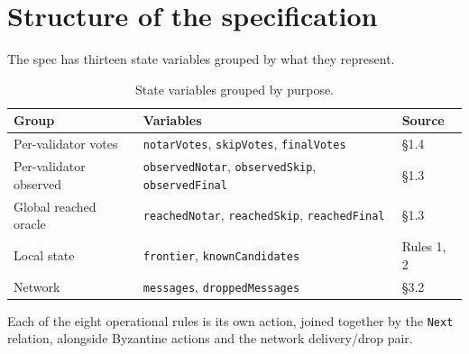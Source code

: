 \documentclass[11pt,a4paper]{article}
\begin{document}
\section{Structure of the specification}\label{sec:spec}

The spec has thirteen state variables grouped by what they represent.

\begin{table}[h]
\centering
\begin{tabular}{lll}
\toprule
Group & Variables & Source \\
\midrule
Per-validator votes      & \texttt{notarVotes}, \texttt{skipVotes}, \texttt{finalVotes}        & §1.4 \\
Per-validator observed   & \texttt{observedNotar}, \texttt{observedSkip}, \texttt{observedFinal} & §1.3 \\
Global reached oracle    & \texttt{reachedNotar}, \texttt{reachedSkip}, \texttt{reachedFinal}  & §1.3 \\
Local state              & \texttt{frontier}, \texttt{knownCandidates}                          & Rules 1, 2 \\
Network                  & \texttt{messages}, \texttt{droppedMessages}                          & §3.2 \\
\bottomrule
\end{tabular}
\caption{State variables grouped by purpose.}
\label{tab:state}
\end{table}

Each of the eight operational rules is its own action, joined together
by the \verb|Next| relation, alongside Byzantine actions and the network
delivery/drop pair.
\end{document}
